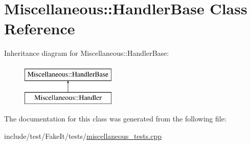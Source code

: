 \hypertarget{classMiscellaneous_1_1HandlerBase}{}\section{Miscellaneous\+::Handler\+Base Class Reference}
\label{classMiscellaneous_1_1HandlerBase}
Inheritance diagram for Miscellaneous\+::Handler\+Base\+:\begin{figure}[H]
\begin{center}
\leavevmode
\includegraphics[height=2.000000cm]{classMiscellaneous_1_1HandlerBase}
\end{center}
\end{figure}


The documentation for this class was generated from the following file\+:\begin{DoxyCompactItemize}
\item 
include/test/\+Fake\+It/tests/\mbox{\hyperlink{miscellaneous__tests_8cpp}{miscellaneous\+\_\+tests.\+cpp}}\end{DoxyCompactItemize}
